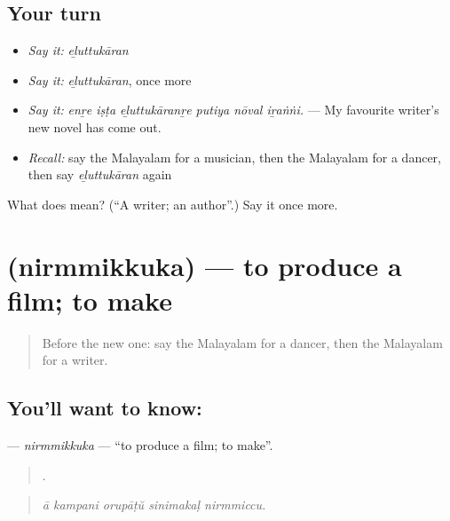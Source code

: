 \subsection*{Your turn}
\begin{itemize}
\raggedright
  \item \emph{Say it:} \emph{eḻuttukāran}
  \item \emph{Say it:} \emph{eḻuttukāran}, once more
  \item \emph{Say it:} \emph{enṟe iṣṭa eḻuttukāranṟe putiya nōval iṟaṅṅi.} — My favourite writer's new novel has come out.
  \item \emph{Recall:} say the Malayalam for a musician, then the Malayalam for a dancer, then say \emph{eḻuttukāran} again
\end{itemize}

\begin{tcolorbox}[breakable,colback=teal!4,colframe=teal!35!black,title={Before you move on}]
What does  mean? (\textquotedblleft{}A writer; an author\textquotedblright{}.) Say it once more.
\end{tcolorbox}
\section[\texorpdfstring{\ml{നിർമ്മിക്കുക} (nirmmikkuka)}{നിർമ്മിക്കുക (nirmmikkuka)}]{ (nirmmikkuka) — to produce a film; to make}

\label{lesson:ML-C565-nirmmikkuka}



\begin{quote}
Before the new one: say the Malayalam for a dancer, then the Malayalam for a writer.
\end{quote}

\subsection*{You'll want to know: }
\textbf{} — \emph{nirmmikkuka} — \textquotedblleft{}to produce a film; to make\textquotedblright{}.

\begin{quote}
    .
\end{quote}

\begin{quote}
\emph{ā kampani orupāṭŭ sinimakaḷ nirmmiccu.}
\end{quote}

